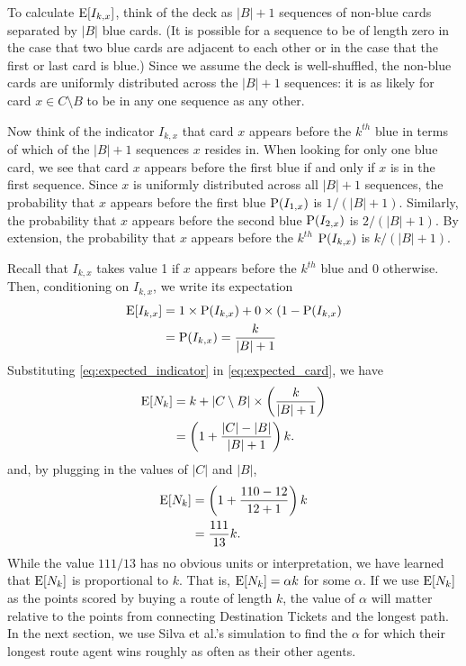 To calculate $\operatorname{\mathrm{E}}[I_{k,x}]$, think of the deck as $|B| + 1$ sequences 
of non-blue cards separated by $|B|$ blue cards.
(It is possible for a sequence to be of length zero
in the case that two blue cards are adjacent to each other or
in the case that the first or last card is blue.)
Since we assume the deck is well-shuffled, the non-blue cards
are uniformly distributed across the $|B| + 1$ sequences:
it is as likely for card $x \in C \setminus B$ to be in any one sequence
as any other.

Now think of the indicator $I_{k,x}$ that card $x$ appears
before the $k^{th}$ blue in terms of which of the $|B| + 1$
sequences $x$ resides in.
When looking for only one blue card,
we see that card $x$ appears before the first blue if and only if
$x$ is in the first sequence.
Since $x$ is uniformly distributed across all $|B| + 1$ sequences,
the probability that $x$ appears before the first blue $\operatorname{\mathrm{P}}(I_{1,x})$
is $1/(|B| + 1)$.
Similarly, the probability that $x$ appears before the second blue
$\operatorname{\mathrm{P}}(I_{2,x})$ is $2/(|B| + 1)$.
By extension, the probability that $x$ appears before the $k^{th}$
$\operatorname{\mathrm{P}}(I_{k,x})$ is $k/(|B| + 1)$.

Recall that $I_{k,x}$ takes value 1 if $x$ appears before the 
$k^{th}$ blue and 0 otherwise.
Then, conditioning on $I_{k,x}$, we write its expectation
\begin{align} \label{eq:expected_indicator}
    \operatorname{\mathrm{E}}[I_{k,x}] &= 1 \times \operatorname{\mathrm{P}}(I_{k,x})
    + 0 \times (1-\operatorname{\mathrm{P}}(I_{k,x}) \nonumber \\
    &=\operatorname{\mathrm{P}}(I_{k,x}) = \frac{k}{|B| + 1}
\end{align}
Substituting \cref{eq:expected_indicator} in \cref{eq:expected_card},
we have
\begin{align}
    \operatorname{\mathrm{E}}[N_k] &= k + |C \setminus B| \times \left(\frac{k}{|B| + 1}\right)
    \nonumber \\
    &= \left(1 + \frac{|C| - |B|}{|B| + 1} \right)k. \nonumber
\end{align}
and, by plugging in the values of $|C|$ and $|B|$,
\begin{align}
    \operatorname{\mathrm{E}}[N_k] &= \left(1 + \frac{110 - 12}{12 + 1} \right)k \nonumber \\
    &= \frac{111}{13}k. \nonumber
\end{align}
While the value $111/13$ has no obvious units or interpretation,
we have learned that $\operatorname{\mathrm{E}}[N_k]$ is proportional to $k$.
That is, $\operatorname{\mathrm{E}}[N_k] = \alpha k$ for some $\alpha$.
If we use $\operatorname{\mathrm{E}}[N_k]$ as the points scored by buying a route of length
$k$, the value of $\alpha$ will matter relative to the points from
connecting Destination Tickets and the longest path.
In the next section, we use Silva et al.'s simulation
to find the $\alpha$ for which their longest route
agent wins roughly as often as their other agents.

